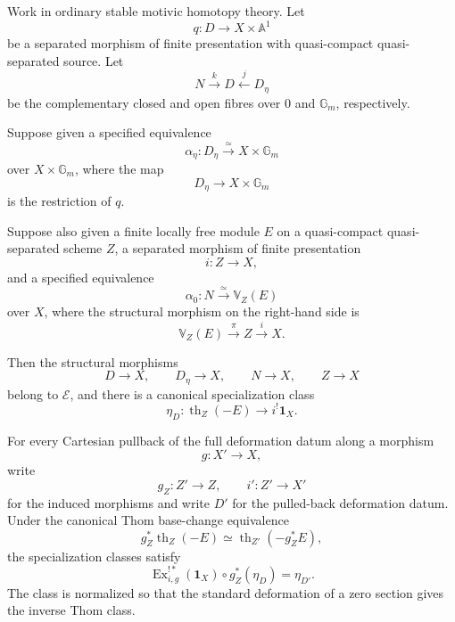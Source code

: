 \begin{theorem}
\label{thm:specialization-deformation-datum}
Work in ordinary stable motivic homotopy theory.  Let
\[
    q:
    D\longrightarrow
    X\times\mathbb A^1
\]
be a separated morphism of finite presentation with quasi-compact
quasi-separated source.  Let
\[
    N\xrightarrow{k}D\xleftarrow{j}D_\eta
\]
be the complementary closed and open fibres over \(0\) and
\(\mathbb G_m\), respectively.

Suppose given a specified equivalence
\[
    \alpha_\eta:
    D_\eta
    \xrightarrow{\simeq}
    X\times\mathbb G_m
\]
over \(X\times\mathbb G_m\), where the map
\[
    D_\eta\longrightarrow X\times\mathbb G_m
\]
is the restriction of \(q\).

Suppose also given a finite locally free module \(E\) on a
quasi-compact quasi-separated scheme \(Z\), a separated morphism of finite
presentation
\[
    i:Z\longrightarrow X,
\]
and a specified equivalence
\[
    \alpha_0:
    N
    \xrightarrow{\simeq}
    \mathbb V_Z(E)
\]
over \(X\), where the structural morphism on the right-hand side is
\[
    \mathbb V_Z(E)
    \xrightarrow{\pi}
    Z
    \xrightarrow{i}
    X.
\]

Then the structural morphisms
\[
    D\longrightarrow X,
    \qquad
    D_\eta\longrightarrow X,
    \qquad
    N\longrightarrow X,
    \qquad
    Z\longrightarrow X
\]
belong to \(\mathcal E\), and there is a canonical specialization class
\[
    \eta_D:
    \operatorname{th}_Z(-E)
    \longrightarrow
    i^!\mathbf1_X.
\]

For every Cartesian pullback of the full deformation datum along a
morphism
\[
    g:X'\longrightarrow X,
\]
write
\[
    g_Z:Z'\longrightarrow Z,
    \qquad
    i':Z'\longrightarrow X'
\]
for the induced morphisms and write \(D'\) for the pulled-back deformation
datum.  Under the canonical Thom base-change equivalence
\[
    g_Z^*\operatorname{th}_Z(-E)
    \simeq
    \operatorname{th}_{Z'}(-g_Z^*E),
\]
the specialization classes satisfy
\[
    \operatorname{Ex}^{!*}_{i,g}(\mathbf1_X)
    \circ
    g_Z^*(\eta_D)
    =
    \eta_{D'}.
\]
The class is normalized so that the standard deformation of a zero section
gives the inverse Thom class.
\end{theorem}

